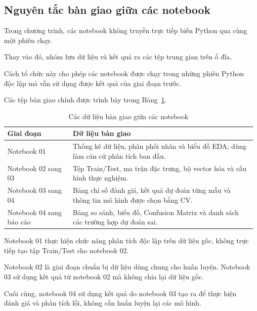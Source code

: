 \subsection{Nguyên tắc bàn giao giữa các notebook}

Trong chương trình, các notebook không truyền trực tiếp biến Python qua cùng một phiên chạy.

Thay vào đó, nhóm lưu dữ liệu và kết quả ra các tệp trung gian trên ổ đĩa.

Cách tổ chức này cho phép các notebook được chạy trong những phiên Python độc lập mà vẫn sử dụng được kết quả của giai đoạn trước.

Các tệp bàn giao chính được trình bày trong Bảng~\ref{tab:ban-giao-notebook}.

\begin{table}[H]
\centering
\caption{Các dữ liệu bàn giao giữa các notebook}
\label{tab:ban-giao-notebook}
\renewcommand{\arraystretch}{1.15}

\begin{tabularx}{\textwidth}{|p{}|X|}
\hline
\textbf{Giai đoạn} &
\textbf{Dữ liệu bàn giao} \\
\hline

Notebook 01 &
Thống kê dữ liệu, phân phối nhãn và biểu đồ EDA; dùng làm căn cứ phân tích ban đầu. \\
\hline

Notebook 02 sang 03 &
Tệp Train/Test, ma trận đặc trưng, bộ vector hóa và cấu hình thực nghiệm. \\
\hline

Notebook 03 sang 04 &
Bảng chỉ số đánh giá, kết quả dự đoán từng mẫu và thông tin mô hình được chọn bằng CV. \\
\hline

Notebook 04 sang báo cáo &
Bảng so sánh, biểu đồ, Confusion Matrix và danh sách các trường hợp dự đoán sai. \\
\hline

\end{tabularx}
\end{table}

Notebook 01 thực hiện chức năng phân tích độc lập trên dữ liệu gốc, không trực tiếp tạo tập Train/Test cho notebook 02.

Notebook 02 là giai đoạn chuẩn bị dữ liệu dùng chung cho huấn luyện. Notebook 03 sử dụng kết quả từ notebook 02 mà không chia lại dữ liệu gốc.

Cuối cùng, notebook 04 sử dụng kết quả do notebook 03 tạo ra để thực hiện đánh giá và phân tích lỗi, không cần huấn luyện lại các mô hình.


